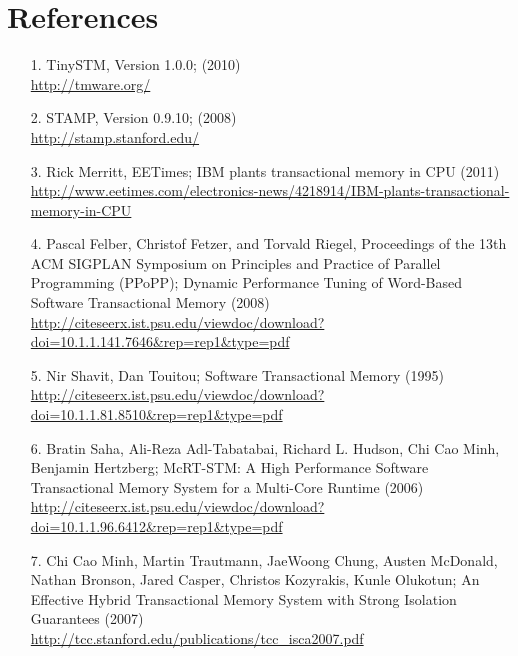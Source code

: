 \documentclass[a4paper,10pt]{report}
\begin{document}
\chapter{References}
\begin{itemize}
 \item [ 1.] TinySTM, Version 1.0.0; (2010) \\ \url{http://tmware.org/}
 \item [ 2.] STAMP, Version 0.9.10; (2008) \\ \url{http://stamp.stanford.edu/}
 \item [ 3.] Rick Merritt, EETimes; IBM plants transactional memory in CPU (2011) \\ \url{http://www.eetimes.com/electronics-news/4218914/IBM-plants-transactional-memory-in-CPU}
 \item [ 4.] Pascal Felber, Christof Fetzer, and Torvald Riegel, Proceedings of the 13th ACM SIGPLAN Symposium on Principles and Practice of Parallel Programming (PPoPP); Dynamic Performance Tuning of Word-Based Software Transactional Memory (2008) \\ \url{http://citeseerx.ist.psu.edu/viewdoc/download?doi=10.1.1.141.7646&rep=rep1&type=pdf}
 \item [ 5.] Nir Shavit, Dan Touitou; Software Transactional Memory (1995) \\ \url{http://citeseerx.ist.psu.edu/viewdoc/download?doi=10.1.1.81.8510&rep=rep1&type=pdf}
 \item [ 6.] Bratin Saha, Ali-Reza Adl-Tabatabai, Richard L. Hudson, Chi Cao Minh, Benjamin Hertzberg; McRT-STM: A High Performance Software Transactional Memory System for a Multi-Core Runtime (2006) \\ \url{http://citeseerx.ist.psu.edu/viewdoc/download?doi=10.1.1.96.6412&rep=rep1&type=pdf}
 \item [ 7.] Chi Cao Minh, Martin Trautmann, JaeWoong Chung, Austen McDonald, Nathan Bronson, Jared Casper, Christos Kozyrakis, Kunle Olukotun; An Effective Hybrid Transactional Memory System with Strong Isolation Guarantees (2007) \\ \url{http://tcc.stanford.edu/publications/tcc_isca2007.pdf}

\end{itemize}
\end{document}
